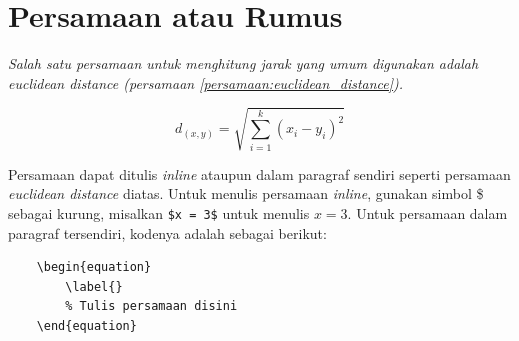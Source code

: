 \section{Persamaan atau Rumus}

\textit{Salah satu persamaan untuk menghitung jarak yang umum digunakan adalah euclidean distance (persamaan \ref{persamaan:euclidean_distance}).}

\begin{equation}
    \label{persamaan:euclidean_distance}
    d_{(x,y)} = \sqrt{\sum_{i=1}^{k} (x_i - y_i)^2}
\end{equation}

Persamaan dapat ditulis \textit{inline} ataupun dalam paragraf sendiri seperti persamaan \textit{euclidean distance} diatas. Untuk menulis persamaan \textit{inline}, gunakan simbol \$ sebagai kurung, misalkan \verb|$x = 3$| untuk menulis $x = 3$. Untuk persamaan dalam paragraf tersendiri, kodenya adalah sebagai berikut:

\begin{verbatim}
    \begin{equation}
        \label{}
        % Tulis persamaan disini 
    \end{equation}
\end{verbatim}

